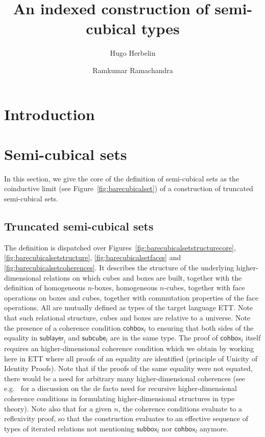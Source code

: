\documentclass[a4paper]{article}
\title{An indexed construction of semi-cubical types}
\author{Hugo Herbelin}
\author{Ramkumar Ramachandra}
\newcommand{\homoname}{}
\newcommand{\downbox}[2]{\mathsf{sub{\homoname}box}_{#1}^{#2}}
\newcommand{\downlayer}[2]{\mathsf{sub{\homoname}layer}_{#1}^{#2}}
\newcommand{\downcube}[2]{\mathsf{sub{\homoname}cube}_{#1}^{#2}}
\newcommand{\cohbox}[2]{\mathsf{coh{\homoname}box}_{#1}^{#2}}
\begin{document}
\maketitle

\tableofcontents

\section{Introduction}
\section{Semi-cubical sets}
\label{sec:truncated-cubical-sets}

In this section, we give the core of the definition of semi-cubical
sets as the coinductive limit (see Figure~\ref{fig:barecubicalset}) of a
construction of truncated semi-cubical sets.

\subsection{Truncated semi-cubical sets}

The definition is dispatched over Figures~\ref{fig:barecubicalsetstructurecore}, \ref{fig:barecubicalsetstructure}, \ref{fig:barecubicalsetfaces} and \ref{fig:barecubicalsetcoherences}. It describes the structure of the underlying higher-dimensional relations on which cubes and boxes are built, together with the definition of homogeneous $n$-boxes, homogeneous $n$-cubes, together with face operations on boxes and cubes, together with commutation properties of the face operations. All are mutually defined as types of the target language ETT. Note that such relational structure, cubes and boxes are relative to a universe. Note the presence of a coherence condition $\cohbox{l}{}$ to ensuring that both sides of the equality in $\downlayer{l}{}$ and $\downcube{l}{}$ are in the same type. The proof of $\cohbox{l}{}$ itself requires an higher-dimensional coherence condition which we obtain by working here in ETT where all proofs of an equality are identified (principle of Unicity of Identity Proofs). Note that if the proofs of the same equality were not equated, there would be a need for arbitrary many higher-dimensional coherences (see e.g.~\cite{Herbelin15} for a discussion on the de facto need for recursive higher-dimensional coherence conditions in formulating higher-dimensional structures in type theory). Note also that for a given $n$, the coherence conditions evaluate to a reflexivity proof, so that the construction evaluates to an effective sequence of types of iterated relations not mentioning $\downbox{l}{}$ nor $\cohbox{l}{}$ anymore.
\end{document}
